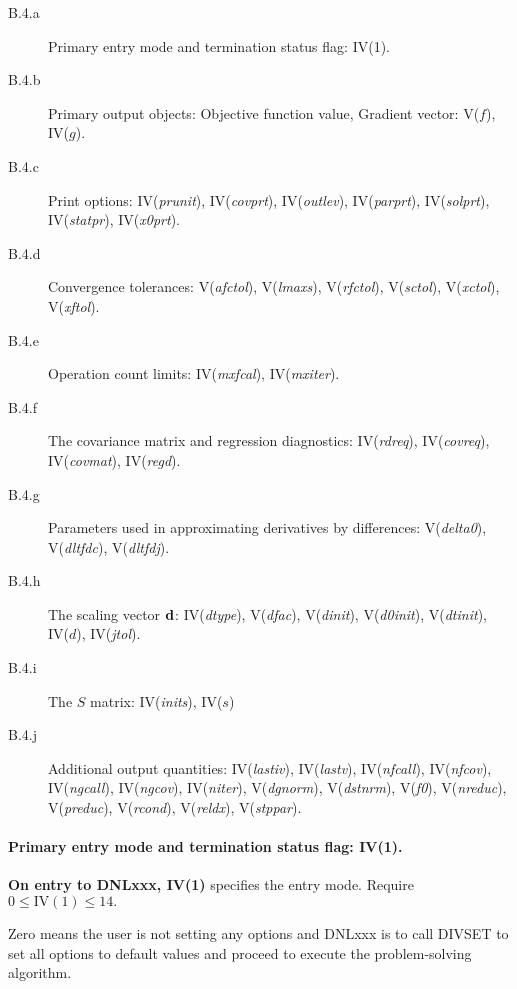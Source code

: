 \documentclass[twoside]{MATH77}
\begin{document}
\begin{description}
\item[B.4.a]  Primary entry mode and termination status flag: IV(1).

\item[B.4.b]  Primary output objects: Objective function value, Gradient
vector: V($f$), IV($g$).

\item[B.4.c]  Print options: IV({\em prunit}), IV({\em covprt}),
IV({\em outlev}), IV({\em parprt}), IV({\em solprt}), IV({\em statpr}),
IV({\em x0prt}).

\item[B.4.d]  Convergence tolerances: V({\em afctol}),
V({\em lmaxs}), V({\em rfctol}), V({\em sctol}), V({\em xctol}),
V({\em xftol}).

\item[B.4.e]  Operation count limits: IV({\em mxfcal}), IV({\em mxiter}).

\item[B.4.f]  The covariance matrix and regression diagnostics: IV({\em rdreq}),
IV({\em covreq}), IV({\em covmat}), IV({\em regd}).

\item[B.4.g]  Parameters used in approximating derivatives by differences:
V({\em delta0}), V({\em dltfdc}), V({\em dltfdj}).

\item[B.4.h]  The scaling vector ${\bf d}$: IV({\em dtype}), V({\em dfac}),
V({\em dinit}), V({\em d0init}), V({\em dtinit}), IV($d$), IV({\em jtol}).

\item[B.4.i]  The $S$ matrix: IV({\em inits}), IV($s$)

\item[B.4.j]  Additional output quantities: IV({\em lastiv}), IV({\em lastv}),
IV({\em nfcall}), IV({\em nfcov}), IV({\em ngcall}), IV({\em ngcov}),
IV({\em niter}), V({\em dgnorm}), V({\em dstnrm}), V({\em f0}),
V({\em nreduc}), V({\em preduc}), V({\em rcond}), V({\em reldx}),
V({\em stppar}).
\end{description}
\paragraph{Primary entry mode and termination status flag: IV(1).}

{\bf On entry to DNLxxx, IV(1)} specifies the entry mode. Require $0 \leq
\text{IV}(1) \leq 14.$

Zero means the user is not setting any options and DNLxxx is to call DIVSET
to set all options to default values and proceed to execute the
problem-solving algorithm.
\end{document}

